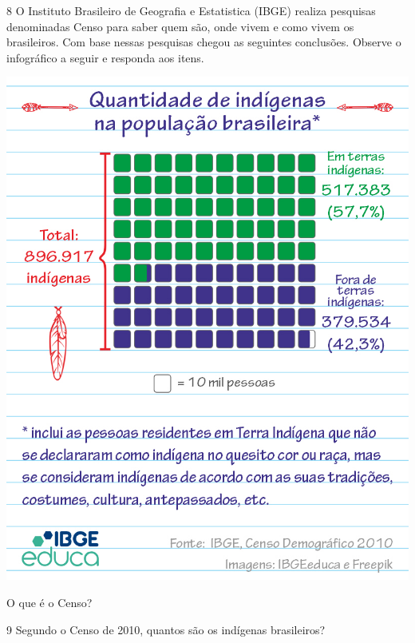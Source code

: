 
\num{8} O Instituto Brasileiro de Geografia e Estatistica (IBGE) realiza pesquisas denominadas Censo para saber quem são, onde vivem e como vivem os brasileiros. Com base nessas pesquisas chegou as seguintes conclusões. Observe o infográfico a seguir e responda aos itens.

\begin{center}
\includegraphics[width=\textwidth]{media/image31a.jpg}
\end{center}

O que é o Censo?


\pagebreak
\num{9} Segundo o Censo de 2010, quantos são os indígenas brasileiros?

